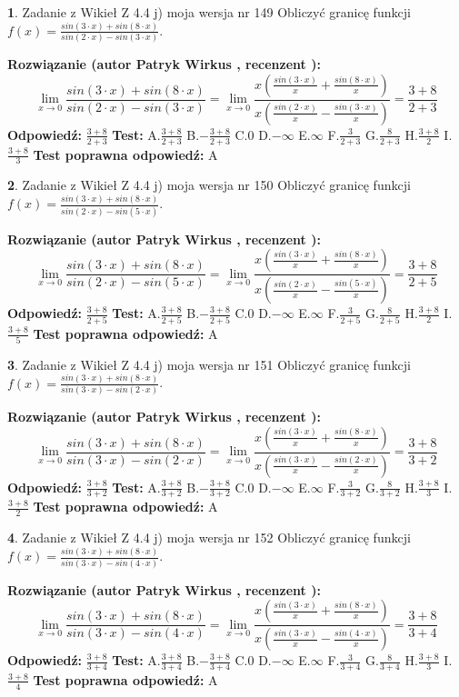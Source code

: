 \documentclass[12pt, a4paper]{article}
\theoremstyle{definition} %
\newtheorem{zad}{}
\newcommand{\zadStart}[1]{\begin{zad}#1\newline}
\newcommand{\zadStop}{\end{zad}}
\newcommand{\rozwStart}[2]{\noindent \textbf{Rozwiązanie (autor #1 , recenzent #2): }\newline}
\newcommand{\rozwStop}{\newline}
\newcommand{\odpStart}{\noindent \textbf{Odpowiedź:}\newline}
\newcommand{\odpStop}{\newline}
\newcommand{\testStart}{\noindent \textbf{Test:}\newline}
\newcommand{\testStop}{\newline}
\newcommand{\kluczStart}{\noindent \textbf{Test poprawna odpowiedź:}\newline}
\newcommand{\kluczStop}{\newline}
\begin{document}
\zadStart{Zadanie z Wikieł Z 4.4 j) moja wersja nr 149}
Obliczyć granicę funkcji $f(x)=\frac{sin(3\cdot x) +sin(8\cdot x)}{sin(2\cdot x) -sin(3\cdot x)}$.
\zadStop
\rozwStart{Patryk Wirkus}{}
$$\lim\limits_{x\to 0}\frac{sin(3\cdot x) +sin(8\cdot x)}{sin(2\cdot x) -sin(3\cdot x)}=\lim\limits_{x\to 0}\frac{x(\frac{sin(3\cdot x)}{x}+\frac{sin(8\cdot x)}{x})}{x(\frac{sin(2\cdot x)}{x}-\frac{sin(3\cdot x)}{x})}=\frac{3+8}{2+3}$$
\rozwStop
\odpStart
$\frac{3+8}{2+3}$
\odpStop
\testStart
A.$\frac{3+8}{2+3}$
B.$-\frac{3+8}{2+3}$
C.$0$
D.$-\infty$
E.$\infty$
F.$\frac{3}{2+3}$
G.$\frac{8}{2+3}$
H.$\frac{3+8}{2}$
I.$\frac{3+8}{3}$
\testStop
\kluczStart
A
\kluczStop



\zadStart{Zadanie z Wikieł Z 4.4 j) moja wersja nr 150}
Obliczyć granicę funkcji $f(x)=\frac{sin(3\cdot x) +sin(8\cdot x)}{sin(2\cdot x) -sin(5\cdot x)}$.
\zadStop
\rozwStart{Patryk Wirkus}{}
$$\lim\limits_{x\to 0}\frac{sin(3\cdot x) +sin(8\cdot x)}{sin(2\cdot x) -sin(5\cdot x)}=\lim\limits_{x\to 0}\frac{x(\frac{sin(3\cdot x)}{x}+\frac{sin(8\cdot x)}{x})}{x(\frac{sin(2\cdot x)}{x}-\frac{sin(5\cdot x)}{x})}=\frac{3+8}{2+5}$$
\rozwStop
\odpStart
$\frac{3+8}{2+5}$
\odpStop
\testStart
A.$\frac{3+8}{2+5}$
B.$-\frac{3+8}{2+5}$
C.$0$
D.$-\infty$
E.$\infty$
F.$\frac{3}{2+5}$
G.$\frac{8}{2+5}$
H.$\frac{3+8}{2}$
I.$\frac{3+8}{5}$
\testStop
\kluczStart
A
\kluczStop



\zadStart{Zadanie z Wikieł Z 4.4 j) moja wersja nr 151}
Obliczyć granicę funkcji $f(x)=\frac{sin(3\cdot x) +sin(8\cdot x)}{sin(3\cdot x) -sin(2\cdot x)}$.
\zadStop
\rozwStart{Patryk Wirkus}{}
$$\lim\limits_{x\to 0}\frac{sin(3\cdot x) +sin(8\cdot x)}{sin(3\cdot x) -sin(2\cdot x)}=\lim\limits_{x\to 0}\frac{x(\frac{sin(3\cdot x)}{x}+\frac{sin(8\cdot x)}{x})}{x(\frac{sin(3\cdot x)}{x}-\frac{sin(2\cdot x)}{x})}=\frac{3+8}{3+2}$$
\rozwStop
\odpStart
$\frac{3+8}{3+2}$
\odpStop
\testStart
A.$\frac{3+8}{3+2}$
B.$-\frac{3+8}{3+2}$
C.$0$
D.$-\infty$
E.$\infty$
F.$\frac{3}{3+2}$
G.$\frac{8}{3+2}$
H.$\frac{3+8}{3}$
I.$\frac{3+8}{2}$
\testStop
\kluczStart
A
\kluczStop



\zadStart{Zadanie z Wikieł Z 4.4 j) moja wersja nr 152}
Obliczyć granicę funkcji $f(x)=\frac{sin(3\cdot x) +sin(8\cdot x)}{sin(3\cdot x) -sin(4\cdot x)}$.
\zadStop
\rozwStart{Patryk Wirkus}{}
$$\lim\limits_{x\to 0}\frac{sin(3\cdot x) +sin(8\cdot x)}{sin(3\cdot x) -sin(4\cdot x)}=\lim\limits_{x\to 0}\frac{x(\frac{sin(3\cdot x)}{x}+\frac{sin(8\cdot x)}{x})}{x(\frac{sin(3\cdot x)}{x}-\frac{sin(4\cdot x)}{x})}=\frac{3+8}{3+4}$$
\rozwStop
\odpStart
$\frac{3+8}{3+4}$
\odpStop
\testStart
A.$\frac{3+8}{3+4}$
B.$-\frac{3+8}{3+4}$
C.$0$
D.$-\infty$
E.$\infty$
F.$\frac{3}{3+4}$
G.$\frac{8}{3+4}$
H.$\frac{3+8}{3}$
I.$\frac{3+8}{4}$
\testStop
\kluczStart
A
\kluczStop
\end{document}
